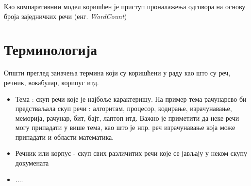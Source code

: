Као компаративнии модел коришћен је приступ проналажења одговора на основу броја заједничких речи (енг. \textit{WordCount})%


\section{Терминологија}

Општи преглед заначења термина који су коришћени у раду као што су реч, речник, вокабулар, корипус итд.

\begin{itemize} 
\item Тема : скуп речи које је најбоље карактеришу. На пример тема рачунарсво би предстваљала скуп речи : алгоритам, процесор, кодирање, израчунавање, меморија, рачунар, бит, бајт, лаптоп итд. Важно је приметити да неке речи могу припадати у више тема, као што је нпр. реч израчунавање која може припадати и области математика.
\item Речник или корпус - скуп свих различитих речи које се јављају у неком скупу докумената
\item ....
 \end{itemize}


